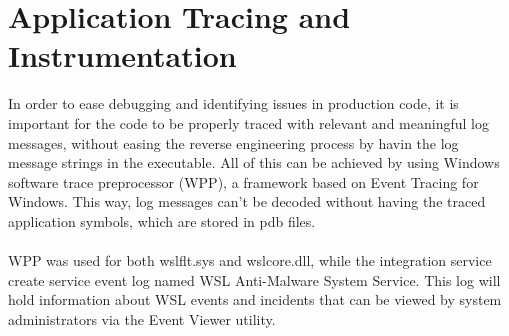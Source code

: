     \section{Application Tracing and Instrumentation}
        In order to ease debugging and identifying issues in production code, it is important for the code to be properly traced with relevant
        and meaningful log messages, without easing the reverse engineering process by havin the log message strings in the executable. All of
        this can be achieved by using Windows software trace preprocessor (WPP), a framework based on Event Tracing for Windows. This way, 
        log messages can't be decoded without having the traced application symbols, which are stored in pdb files.

        \paragraph{}
        WPP was used for both wslflt.sys and wslcore.dll, while the integration service create service event log named WSL Anti-Malware System 
        Service. This log will hold information about WSL events and incidents that can be viewed by system administrators via the Event Viewer
        utility.